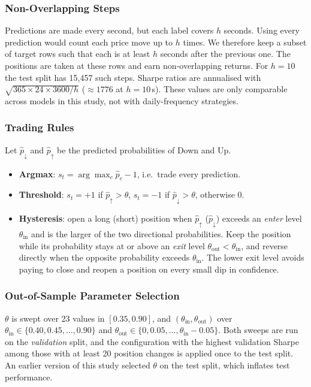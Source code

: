 \subsubsection{Non-Overlapping Steps}
Predictions are made every second, but each label covers $h$ seconds. Using every
prediction would count each price move up to $h$ times. We therefore keep a subset of
target rows such that each is at least $h$ seconds after the previous one. The positions
are taken at these rows and earn non-overlapping returns. For $h=10$ the test split has
15,457 such steps. Sharpe ratios are annualised with
$\sqrt{365 \times 24 \times 3600 / h}$ ($\approx 1776$ at $h=10$\,s). These values are
only comparable across models in this study, not with daily-frequency strategies.

\subsubsection{Trading Rules}
Let $\hat p_{\downarrow}$ and $\hat p_{\uparrow}$ be the predicted probabilities of Down and Up.
\begin{itemize}
  \item \textbf{Argmax}: $s_t = \arg\max_c \hat p_c - 1$, i.e.\ trade every prediction.
  \item \textbf{Threshold}: $s_t = +1$ if $\hat p_{\uparrow} > \theta$, $s_t = -1$ if
  $\hat p_{\downarrow} > \theta$, otherwise $0$.
  \item \textbf{Hysteresis}: open a long (short) position when $\hat p_{\uparrow}$
  ($\hat p_{\downarrow}$) exceeds an \emph{enter} level $\theta_{\text{in}}$ and is the larger of
  the two directional probabilities. Keep the position while its probability stays at or
  above an \emph{exit} level $\theta_{\text{out}} < \theta_{\text{in}}$, and reverse directly
  when the opposite probability exceeds $\theta_{\text{in}}$. The lower exit level avoids
  paying to close and reopen a position on every small dip in confidence.
\end{itemize}

\subsubsection{Out-of-Sample Parameter Selection}
$\theta$ is swept over 23 values in $[0.35, 0.90]$, and
$(\theta_{\text{in}}, \theta_{\text{out}})$ over $\theta_{\text{in}} \in \{0.40, 0.45,
\dots, 0.90\}$ and $\theta_{\text{out}} \in \{0, 0.05, \dots, \theta_{\text{in}} - 0.05\}$.
Both sweeps are run on the \emph{validation} split, and the configuration with the
highest validation Sharpe among those with at least 20 position changes is applied once to
the test split. An earlier version of this study selected $\theta$ on the test split, which
inflates test performance.

